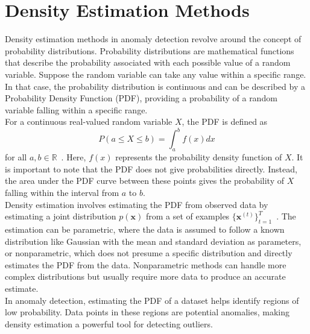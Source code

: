 \section{Density Estimation Methods}
Density estimation methods in anomaly detection revolve around the concept of probability distributions. Probability distributions are mathematical functions that describe the probability associated with each possible value of a random variable. Suppose the random variable can take any value within a specific range. In that case, the probability distribution is continuous and can be described by a Probability Density Function (PDF), providing a probability of a random variable falling within a specific range.\\
For a continuous real-valued random variable $X$, the PDF is defined as
\[ P(a\leq X\leq b)=\int_a^bf(x)dx \]
for all $ a, b \in \mathbb{R}$~\cite{grinstead2006probabilities}. Here, $f(x)$ represents the probability density function of $X$. It is important to note that the PDF does not give probabilities directly. Instead, the area under the PDF curve between these points gives the probability of $X$ falling within the interval from $a$ to $b$.\\
Density estimation involves estimating the PDF from observed data by estimating a joint distribution $ p(\mathbf{x}) $ from a set of examples $ \{ \mathbf{x}^{(t)}\}^T_{t=1}$~\cite{germain2015made}. The estimation can be parametric, where the data is assumed to follow a known distribution like Gaussian with the mean and standard deviation as parameters, or nonparametric, which does not presume a specific distribution and directly estimates the PDF from the data. Nonparametric methods can handle more complex distributions but usually require more data to produce an accurate estimate.\\
In anomaly detection, estimating the PDF of a dataset helps identify regions of low probability. Data points in these regions are potential anomalies, making density estimation a powerful tool for detecting outliers.


